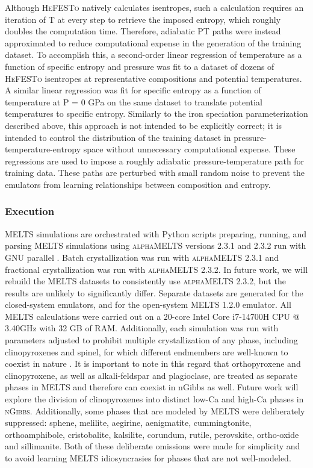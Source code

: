 Although \textsc{HeFESTo} natively calculates isentropes, such a calculation requires an iteration of T at every step to retrieve the imposed entropy, which roughly doubles the computation time. Therefore, adiabatic PT paths were instead approximated to reduce computational expense in the generation of the training dataset. To accomplish this, a second-order linear regression of temperature as a function of specific entropy and pressure was fit to a dataset of dozens of \textsc{HeFESTo} isentropes at representative compositions and potential temperatures. A similar linear regression was fit for specific entropy as a function of temperature at P = 0 GPa on the same dataset to translate potential temperatures to specific entropy. Similarly to the iron speciation parameterization described above, this approach is not intended to be explicitly correct; it is intended to control the distribution of the training dataset in pressure-temperature-entropy space without unnecessary computational expense. These regressions are used to impose a roughly adiabatic pressure-temperature path for training data. These paths are perturbed with small random noise to prevent the emulators from learning relationships between composition and entropy. 

\subsubsection{Execution}

\textsc{MELTS} simulations are orchestrated with Python scripts preparing, running, and parsing MELTS simulations using \textsc{alphaMELTS} versions
2.3.1 and 2.3.2 \citep{smithasimow2005} run with GNU parallel \citep{tange2021}. Batch crystallization was run with \textsc{alphaMELTS} 2.3.1 and fractional crystallization 
was run with \textsc{alphaMELTS} 2.3.2. In future work, we will rebuild the MELTS datasets to consistently use \textsc{alphaMELTS} 2.3.2, but the results
are unlikely to significantly differ. Separate datasets are generated for the closed-system emulators, and for the open-system \textsc{MELTS} 1.2.0 emulator. 
All MELTS calculations were carried out on a 20-core Intel Core i7-14700H CPU @ 3.40GHz with 32 GB of RAM. Additionally, each simulation was run with parameters
adjusted to prohibit multiple crystallization of any phase, including clinopyroxenes and spinel, for which different endmembers are well-known to coexist in nature
\citep{lindsley1983,stosch1980}. It is important to note in this regard that orthopyroxene and clinopyroxene, as well as alkali-feldspar and plagioclase, are treated as separate phases in 
\textsc{MELTS} and therefore can coexist in nGibbs as well. Future work will explore the division of clinopyroxenes into distinct low-Ca and high-Ca phases 
in \textsc{nGibbs}. Additionally, some phases that are modeled by \textsc{MELTS} were deliberately suppressed: sphene, melilite, aegirine, aenigmatite, cummingtonite, 
orthoamphibole, cristobalite, kalsilite, corundum, rutile, perovskite, ortho-oxide and sillimanite. Both of these deliberate omissions were made for simplicity 
and to avoid learning \textsc{MELTS} idiosyncrasies for phases that are not well-modeled. 


